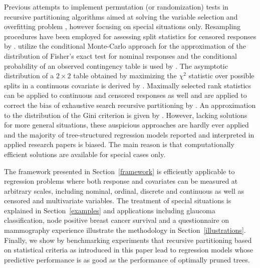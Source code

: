 Previous attempts to implement permutation (or randomization) tests in
recursive partitioning algorithms aimed at solving the variable selection
and overfitting problem \citep{JensenCohen2000}, however focusing on special
situations only. 
Resampling procedures have been employed for assessing split
statistics for censored responses by \cite{survival-t:1993}.
\cite{FrankWitten1998} utilize the conditional Monte-Carlo approach for the
approximation of the distribution of Fisher's exact test for nominal
responses and the conditional probability of an observed contingency table
is used by \cite{Martin1997}. 
The asymptotic distribution of a $2 \times 2$ table obtained by maximizing
the $\chi^2$ statistic over possible splits in a continuous covariate is  
derived by \cite{maximally-:1982}. Maximally selected rank statistics 
\citep{maximally-:1992} can be
applied to continuous and censored responses as well and are  
applied to correct the bias of exhaustive search recursive partitioning by
\cite{Lausen2004}.
An approximation to the distribution of the Gini criterion
is given by \cite{DobraGehrke2001}. However, lacking solutions for more
general situations,  these auspicious approaches are hardly ever applied 
and the majority of tree-structured regression models reported and
interpreted in applied research papers is biased. 
The main reason is that computationally efficient solutions are
available for special cases only. 

The framework presented in
Section~\ref{framework} is efficiently applicable to regression
problems where both response and covariates can be measured at arbitrary
scales, including nominal, ordinal, discrete and
continuous as well as censored and multivariate variables.
The treatment of special situations is explained in Section~\ref{examples}
and applications including glaucoma classification, node
positive breast cancer survival and a questionnaire on mammography experience
illustrate the methodology in Section~\ref{illustrations}. 
Finally, we show by benchmarking experiments that  
recursive partitioning based on statistical criteria 
as introduced in this paper lead to regression 
models whose predictive performance is as good as the performance of optimally 
pruned trees.
